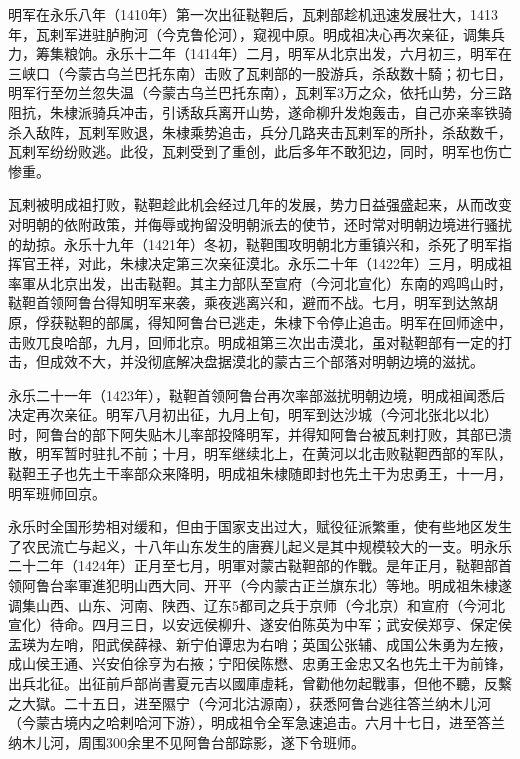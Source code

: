 明军在永乐八年（1410年）第一次出征鞑靼后，瓦剌部趁机迅速发展壮大，1413年，瓦剌军进驻胪朐河（今克鲁伦河），窥视中原。明成祖决心再次亲征，调集兵力，筹集粮饷。永乐十二年（1414年）二月，明军从北京出发，六月初三，明军在三峡口（今蒙古乌兰巴托东南）击败了瓦剌部的一股游兵，杀敌数十騎；初七日，明军行至勿兰忽失温（今蒙古乌兰巴托东南），瓦剌军3万之众，依托山势，分三路阻抗，朱棣派骑兵冲击，引诱敌兵离开山势，遂命柳升发炮轰击，自己亦亲率铁骑杀入敌阵，瓦剌军败退，朱棣乘势追击，兵分几路夹击瓦剌军的所扑，杀敌数千，瓦剌军纷纷败逃。此役，瓦剌受到了重创，此后多年不敢犯边，同时，明军也伤亡惨重。

瓦剌被明成祖打败，鞑靼趁此机会经过几年的发展，势力日益强盛起来，从而改变对明朝的依附政策，并侮辱或拘留没明朝派去的使节，还时常对明朝边境进行骚扰的劫掠。永乐十九年（1421年）冬初，鞑靼围攻明朝北方重镇兴和，杀死了明军指挥官王祥，对此，朱棣决定第三次亲征漠北。永乐二十年（1422年）三月，明成祖率軍从北京出发，出击鞑靼。其主力部队至宣府（今河北宣化）东南的鸡鸣山时，鞑靼首领阿鲁台得知明军来袭，乘夜逃离兴和，避而不战。七月，明军到达煞胡原，俘获鞑靼的部属，得知阿鲁台已逃走，朱棣下令停止追击。明军在回师途中，击败兀良哈部，九月，回师北京。明成祖第三次出击漠北，虽对鞑靼部有一定的打击，但成效不大，并没彻底解决盘据漠北的蒙古三个部落对明朝边境的滋扰。

永乐二十一年（1423年），鞑靼首领阿鲁台再次率部滋扰明朝边境，明成祖闻悉后决定再次亲征。明军八月初出征，九月上旬，明军到达沙城（今河北张北以北）时，阿鲁台的部下阿失贴木儿率部投降明军，并得知阿鲁台被瓦剌打败，其部已溃散，明军暂时驻扎不前；十月，明军继续北上，在黄河以北击败鞑靼西部的军队，鞑靼王子也先土干率部众来降明，明成祖朱棣随即封也先土干为忠勇王，十一月，明军班师回京。

永乐时全国形势相对缓和，但由于国家支出过大，赋役征派繁重，使有些地区发生了农民流亡与起义，十八年山东发生的唐赛儿起义是其中规模较大的一支。明永乐二十二年（1424年）正月至七月，明軍对蒙古鞑靼部的作戰。是年正月，鞑靼部首领阿鲁台率軍進犯明山西大同、开平（今内蒙古正兰旗东北）等地。明成祖朱棣遂调集山西、山东、河南、陕西、辽东5都司之兵于京师（今北京）和宣府（今河北宣化）待命。四月三日，以安远侯柳升、遂安伯陈英为中军；武安侯郑亨、保定侯盂瑛为左哨，阳武侯薛禄、新宁伯谭忠为右哨；英国公张辅、成国公朱勇为左掖，成山侯王通、兴安伯徐亨为右掖；宁阳侯陈懋、忠勇王金忠又名也先土干为前锋，出兵北征。出征前戶部尚書夏元吉以國庫虛耗，曾勸他勿起戰事，但他不聽，反繫之大獄。二十五日，进至隰宁（今河北沽源南），获悉阿鲁台逃往答兰纳木儿河（今蒙古境内之哈剌哈河下游），明成祖令全军急速追击。六月十七日，进至答兰纳木儿河，周围300余里不见阿鲁台部踪影，遂下令班师。

